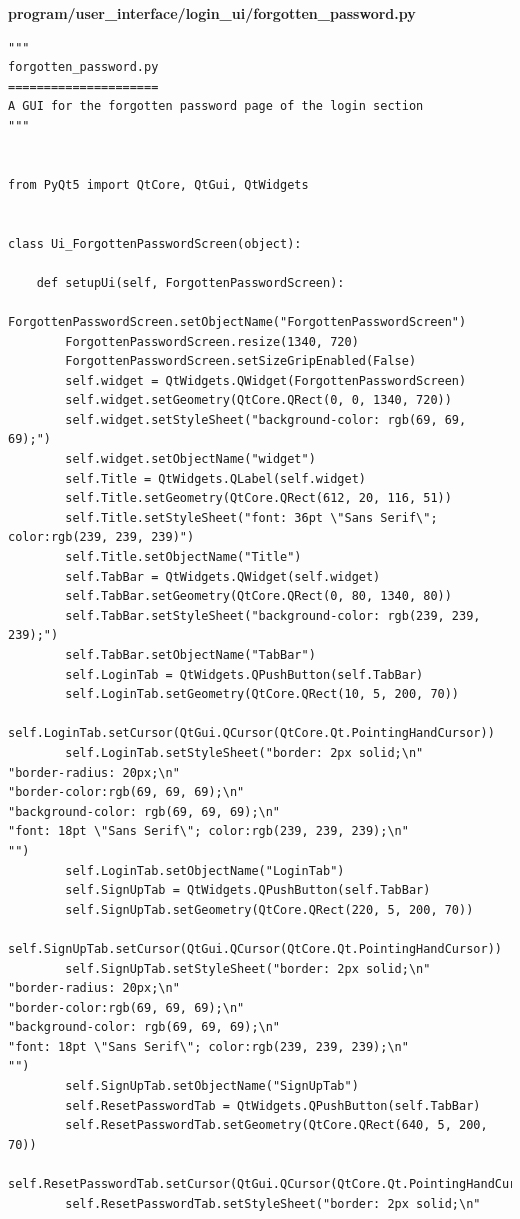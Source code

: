 \documentclass[12pt]{article}
\begin{document}
\textbf{program/user\_interface/login\_ui/forgotten\_password.py}
\begin{lstlisting}
"""
forgotten_password.py
=====================
A GUI for the forgotten password page of the login section
"""


from PyQt5 import QtCore, QtGui, QtWidgets


class Ui_ForgottenPasswordScreen(object):

    def setupUi(self, ForgottenPasswordScreen):
        ForgottenPasswordScreen.setObjectName("ForgottenPasswordScreen")
        ForgottenPasswordScreen.resize(1340, 720)
        ForgottenPasswordScreen.setSizeGripEnabled(False)
        self.widget = QtWidgets.QWidget(ForgottenPasswordScreen)
        self.widget.setGeometry(QtCore.QRect(0, 0, 1340, 720))
        self.widget.setStyleSheet("background-color: rgb(69, 69, 69);")
        self.widget.setObjectName("widget")
        self.Title = QtWidgets.QLabel(self.widget)
        self.Title.setGeometry(QtCore.QRect(612, 20, 116, 51))
        self.Title.setStyleSheet("font: 36pt \"Sans Serif\"; color:rgb(239, 239, 239)")
        self.Title.setObjectName("Title")
        self.TabBar = QtWidgets.QWidget(self.widget)
        self.TabBar.setGeometry(QtCore.QRect(0, 80, 1340, 80))
        self.TabBar.setStyleSheet("background-color: rgb(239, 239, 239);")
        self.TabBar.setObjectName("TabBar")
        self.LoginTab = QtWidgets.QPushButton(self.TabBar)
        self.LoginTab.setGeometry(QtCore.QRect(10, 5, 200, 70))
        self.LoginTab.setCursor(QtGui.QCursor(QtCore.Qt.PointingHandCursor))
        self.LoginTab.setStyleSheet("border: 2px solid;\n"
"border-radius: 20px;\n"
"border-color:rgb(69, 69, 69);\n"
"background-color: rgb(69, 69, 69);\n"
"font: 18pt \"Sans Serif\"; color:rgb(239, 239, 239);\n"
"")
        self.LoginTab.setObjectName("LoginTab")
        self.SignUpTab = QtWidgets.QPushButton(self.TabBar)
        self.SignUpTab.setGeometry(QtCore.QRect(220, 5, 200, 70))
        self.SignUpTab.setCursor(QtGui.QCursor(QtCore.Qt.PointingHandCursor))
        self.SignUpTab.setStyleSheet("border: 2px solid;\n"
"border-radius: 20px;\n"
"border-color:rgb(69, 69, 69);\n"
"background-color: rgb(69, 69, 69);\n"
"font: 18pt \"Sans Serif\"; color:rgb(239, 239, 239);\n"
"")
        self.SignUpTab.setObjectName("SignUpTab")
        self.ResetPasswordTab = QtWidgets.QPushButton(self.TabBar)
        self.ResetPasswordTab.setGeometry(QtCore.QRect(640, 5, 200, 70))
        self.ResetPasswordTab.setCursor(QtGui.QCursor(QtCore.Qt.PointingHandCursor))
        self.ResetPasswordTab.setStyleSheet("border: 2px solid;\n"

\end{lstlisting}
\end{document}
